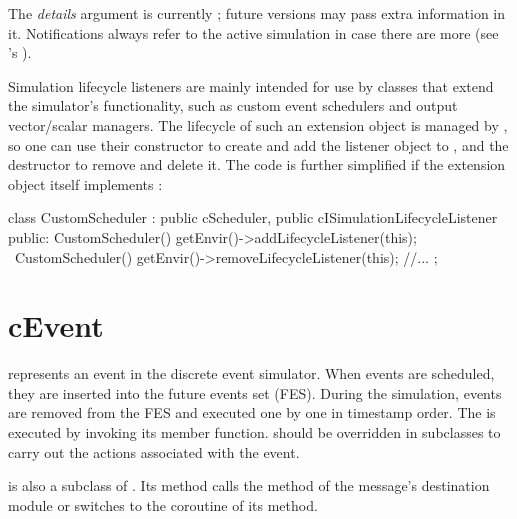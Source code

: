 The \textit{details} argument is currently ; future {\opp} versions
may pass extra information in it. Notifications always refer to the active
simulation in case there are more (see 's
).

Simulation lifecycle listeners are mainly intended for use by classes that
extend the simulator's functionality, such as custom event schedulers and output
vector/scalar managers. The lifecycle of such an extension object is managed by
{\opp}, so one can use their constructor to create and add the listener object
to , and the destructor to remove and delete it. The code is
further simplified if the extension object itself implements
:


\begin{cpp}
class CustomScheduler : public cScheduler, public cISimulationLifecycleListener
{
  public:
    CustomScheduler() { getEnvir()->addLifecycleListener(this); }
    ~CustomScheduler() { getEnvir()->removeLifecycleListener(this); }
    //...
};
\end{cpp}


\section{cEvent}
\label{sec:plugin-exts:cevent}

 represents an event in the discrete event simulator. When
events are scheduled, they are inserted into the future events set (FES).
During the simulation, events are removed from the FES and executed one by
one in timestamp order. The  is executed by invoking its
 member function.  should be overridden
in subclasses to carry out the actions associated with the event.

\begin{note}
 is also a subclass of . Its
 method calls the  method of the
message's destination module or switches to the coroutine of its
 method.
\end{note}

